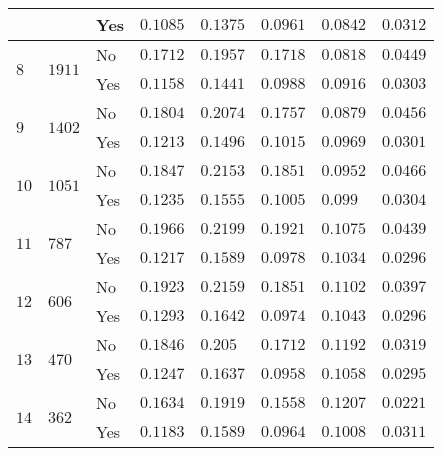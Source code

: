 \begin{table}[h]
\begin{adjustwidth}{-2cm}{}
\begin{tabular}{ C{1cm} C{1cm} C{2.1cm}|C{2.1cm} C{2.1cm} C{2.1cm} C{2.1cm} C{2.1cm} }
                                                    && Yes & $0.1085$ & $0.1375$ & $0.0961$ & $0.0842$ & $0.0312$  \\ \midrule
       &  & No  & $0.1712$ & $0.1957$ & $0.1718$ & $0.0818$ & $0.0449$  \\
                                                    && Yes & $0.1158$ & $0.1441$ & $0.0988$ & $0.0916$ & $0.0303$  \\ \midrule
       &  & No  & $0.1804$ & $0.2074$ & $0.1757$ & $0.0879$ & $0.0456$  \\
                                                    && Yes & $0.1213$ & $0.1496$ & \color{Plum}$\mathbf{0.1015}$ & $0.0969$ & $0.0301$  \\ \midrule
       &  & No & $0.1847$ & $0.2153$ & $0.1851$ & $0.0952$ & $0.0466$  \\
                                                    && Yes & $0.1235$ & $0.1555$ & $0.1005$ & $0.099$  & $0.0304$  \\ \midrule
       &  & No  & \color{blue}$\mathbf{0.1966}$ & \color{blue}$\mathbf{0.2199}$ & \color{blue}$\mathbf{0.1921}$ & $0.1075$ & $0.0439$  \\
                                                    && Yes & $0.1217$ & $0.1589$ & $0.0978$ & $0.1034$ & $0.0296$  \\ \midrule
       &  & No  & $0.1923$ & $0.2159$ & $0.1851$ & $0.1102$ & $0.0397$  \\
                                                    && Yes & \color{Plum}$\mathbf{0.1293}$ & \color{Plum}$\mathbf{0.1642}$ & $0.0974$ & $0.1043$ & $0.0296$  \\ \midrule
       &  & No  & $0.1846$ & $0.205$ & $0.1712$ & $0.1192$ & $0.0319$   \\
                                                    && Yes & $0.1247$ & $0.1637$ & $0.0958$ & \color{Plum}$\mathbf{0.1058}$ & $0.0295$  \\ \midrule
       &  & No  & $0.1634$ & $0.1919$ & $0.1558$ & \color{blue}$\mathbf{0.1207}$ & $0.0221$  \\
                                                    && Yes & $0.1183$ & $0.1589$ & $0.0964$ & $0.1008$ & $0.0311$  \\

\end{tabular}
\end{adjustwidth}
\end{table}
